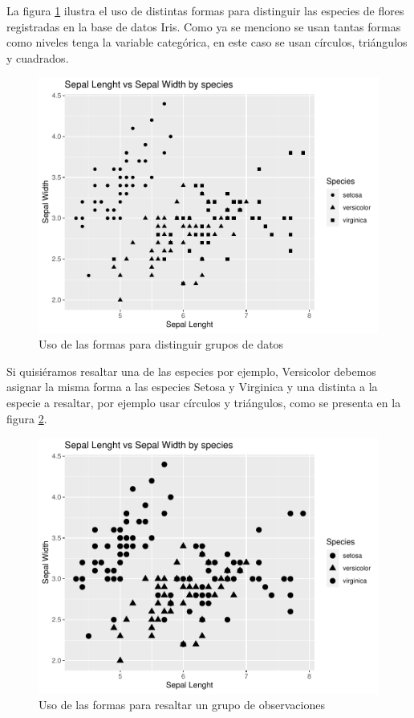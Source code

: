 \documentclass[
]{book}
\begin{document}
La figura \ref{fig:formasparadistinguir-fig} ilustra el uso de distintas formas para distinguir las especies de flores registradas en la base de datos Iris. Como ya se menciono se usan tantas formas como niveles tenga la variable categórica, en este caso se usan círculos, triángulos y cuadrados.

\begin{figure}

{\centering \includegraphics[width=0.8\linewidth]{Lineamientos-Visualizar_files/figure-latex/formasparadistinguir-fig-1} 

}

\caption{Uso de las formas para distinguir grupos de datos}\label{fig:formasparadistinguir-fig}
\end{figure}

Si quisiéramos resaltar una de las especies por ejemplo, Versicolor debemos asignar la misma forma a las especies Setosa y Virginica y una distinta a la especie a resaltar, por ejemplo usar círculos y triángulos, como se presenta en la figura \ref{fig:formaspararesaltar-fig}.

\begin{figure}

{\centering \includegraphics[width=0.8\linewidth]{Lineamientos-Visualizar_files/figure-latex/formaspararesaltar-fig-1} 

}

\caption{Uso de las formas para resaltar un grupo de observaciones}\label{fig:formaspararesaltar-fig}
\end{figure}
\end{document}
